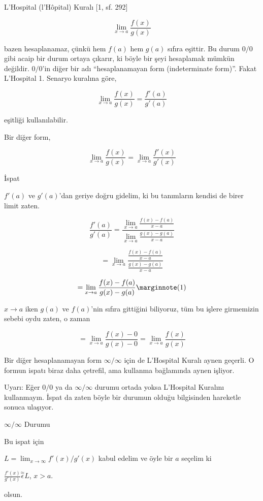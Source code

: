 \documentclass[12pt,fleqn]{article}\usepackage{../../common}
\begin{document}
L'Hospital (l'Hôpital) Kuralı [1, sf. 292]

$$ \lim_{x \to a} \frac{f(x)}{g(x)}$$

bazen hesaplanamaz, çünkü hem $f(a)$ hem $g(a)$ sıfıra eşittir. Bu durum
$0/0$ gibi acaip bir durum ortaya çıkarır, ki böyle bir şeyi hesaplamak mümkün
değildir. $0/0$'in diğer bir adı ``hesaplanamayan form (indeterminate
form)''. Fakat L'Hospital 1. Senaryo kuralına göre, 

$$ \lim_{x \to a} \frac{f(x)}{g(x)} = 
\frac{f'(a)}{g'(a)} 
$$

eşitliği kullanılabilir. 

Bir diğer form,

$$ \lim_{x \to a} \frac{f(x)}{g(x)} = 
\lim_{x \to a} \frac{f'(x)}{g'(x)} 
$$

İspat

$f'(a)$ ve $g'(a)$'dan geriye doğru gidelim, ki bu tanımların kendisi de
birer limit zaten. 

$$ 
\frac{\displaystyle f'(a)}{g'(a)} = 
\frac
{\lim_{x \to a}\frac{\displaystyle f(x) - f(a)}{\displaystyle x-a}}
{\lim_{x \to a}\frac{\displaystyle g(x) - g(a)}{\displaystyle x-a}}
$$

$$ =
\lim_{x \to a } \frac
{\frac{\displaystyle f(x) - f(a)}{\displaystyle x-a}}
{\frac{\displaystyle g(x) - g(a)}{\displaystyle x-a}}
$$

$$ =
\lim_{x \to a } \frac
{f(x) - f(a) }{g(x)-g(a)}
\mlabel{1}
$$

$x \to a$ iken $g(a)$ ve $f(a)$'nin sıfıra gittiğini biliyoruz, tüm bu
işlere girmemizin sebebi oydu zaten, o zaman 

$$ =
\lim_{x \to a } \frac
{f(x) - 0 }{g(x)- 0} = 
\lim_{x \to a }  \frac{f(x)  }{g(x)}
$$

Bir diğer hesaplanamayan form $\infty/\infty$ için de L'Hospital Kuralı
aynen geçerli. O formun ispatı biraz daha çetrefil, ama kullanma bağlamında
aynen işliyor. 

Uyarı: Eğer $0/0$ ya da  $\infty/\infty$ durumu ortada yoksa L'Hospital
Kuralını kullanmayın. İspat da zaten böyle bir durumun olduğu bilgisinden 
hareketle sonuca ulaşıyor. 

$\infty/\infty$ Durumu

Bu ispat için

$L=\lim_{x \to \infty} f'(x)/g'(x)$ kabul edelim ve öyle bir $a$ seçelim ki

$\frac{f'(x)}{g'(x)} \stackrel{\approx}{\epsilon} L$, $x>a$. 

olsun. 
\end{document}
